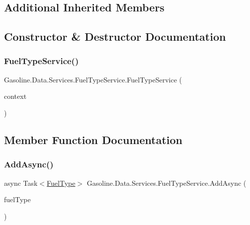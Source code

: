 \subsection*{Additional Inherited Members}


\subsection{Constructor \& Destructor Documentation}
\mbox{\label{class_gasoline_1_1_data_1_1_services_1_1_fuel_type_service_a59eec788fd36117311ee0b58dd5e1f9a}} 
\subsubsection{\texorpdfstring{FuelTypeService()}{FuelTypeService()}}
{\footnotesize\ttfamily Gasoline.\+Data.\+Services.\+Fuel\+Type\+Service.\+Fuel\+Type\+Service (\begin{DoxyParamCaption}\item[{\mbox{\hyperlink{class_gasoline_1_1_data_1_1_e_f_1_1_gasoline_context}{Gasoline\+Context}}}]{context }\end{DoxyParamCaption})}



\subsection{Member Function Documentation}
\mbox{\label{class_gasoline_1_1_data_1_1_services_1_1_fuel_type_service_ace9a723344fbcdbd8d8f05a6d93bf56a}} 
\subsubsection{\texorpdfstring{AddAsync()}{AddAsync()}}
{\footnotesize\ttfamily async Task$<$\mbox{\hyperlink{class_gasoline_1_1_data_1_1_models_1_1_fuel_type}{Fuel\+Type}}$>$ Gasoline.\+Data.\+Services.\+Fuel\+Type\+Service.\+Add\+Async (\begin{DoxyParamCaption}\item[{\mbox{\hyperlink{class_gasoline_1_1_data_1_1_models_1_1_fuel_type}{Fuel\+Type}}}]{fuel\+Type }\end{DoxyParamCaption})}



